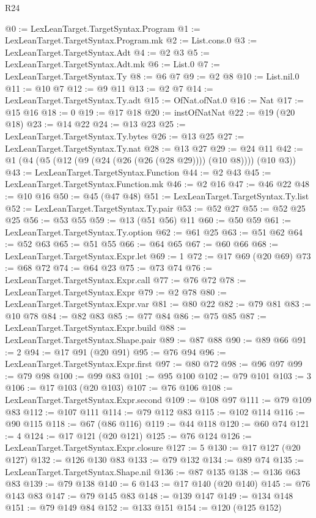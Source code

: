 \begin{lexlean}{R24}
\begin{coremodule}
@0 := LexLeanTarget.TargetSyntax.Program
@1 := LexLeanTarget.TargetSyntax.Program.mk
@2 := List.cons.{0}
@3 := LexLeanTarget.TargetSyntax.Adt
@4 := @2 @3
@5 := LexLeanTarget.TargetSyntax.Adt.mk
@6 := List.{0}
@7 := LexLeanTarget.TargetSyntax.Ty
@8 := @6 @7
@9 := @2 @8
@10 := List.nil.{0}
@11 := @10 @7
@12 := @9 @11
@13 := @2 @7
@14 := LexLeanTarget.TargetSyntax.Ty.adt
@15 := OfNat.ofNat.{0}
@16 := Nat
@17 := @15 @16
@18 := 0
@19 := @17 @18
@20 := instOfNatNat
@22 := @19 (@20 @18)
@23 := @14 @22
@24 := @13 @23
@25 := LexLeanTarget.TargetSyntax.Ty.bytes
@26 := @13 @25
@27 := LexLeanTarget.TargetSyntax.Ty.nat
@28 := @13 @27
@29 := @24 @11
@42 := @1 (@4 (@5 (@12 (@9 (@24 (@26 (@26 (@28 @29)))) (@10 @8)))) (@10 @3))
@43 := LexLeanTarget.TargetSyntax.Function
@44 := @2 @43
@45 := LexLeanTarget.TargetSyntax.Function.mk
@46 := @2 @16
@47 := @46 @22
@48 := @10 @16
@50 := @45 (@47 @48)
@51 := LexLeanTarget.TargetSyntax.Ty.list
@52 := LexLeanTarget.TargetSyntax.Ty.pair
@53 := @52 @27
@55 := @52 @25 @25
@56 := @53 @55
@59 := @13 (@51 @56) @11
@60 := @50 @59
@61 := LexLeanTarget.TargetSyntax.Ty.option
@62 := @61 @25
@63 := @51 @62
@64 := @52 @63
@65 := @51 @55
@66 := @64 @65
@67 := @60 @66
@68 := LexLeanTarget.TargetSyntax.Expr.let
@69 := 1
@72 := @17 @69 (@20 @69)
@73 := @68 @72
@74 := @64 @23
@75 := @73 @74
@76 := LexLeanTarget.TargetSyntax.Expr.call
@77 := @76 @72
@78 := LexLeanTarget.TargetSyntax.Expr
@79 := @2 @78
@80 := LexLeanTarget.TargetSyntax.Expr.var
@81 := @80 @22
@82 := @79 @81
@83 := @10 @78
@84 := @82 @83
@85 := @77 @84
@86 := @75 @85
@87 := LexLeanTarget.TargetSyntax.Expr.build
@88 := LexLeanTarget.TargetSyntax.Shape.pair
@89 := @87 @88
@90 := @89 @66
@91 := 2
@94 := @17 @91 (@20 @91)
@95 := @76 @94
@96 := LexLeanTarget.TargetSyntax.Expr.first
@97 := @80 @72
@98 := @96 @97
@99 := @79 @98
@100 := @99 @83
@101 := @95 @100
@102 := @79 @101
@103 := 3
@106 := @17 @103 (@20 @103)
@107 := @76 @106
@108 := LexLeanTarget.TargetSyntax.Expr.second
@109 := @108 @97
@111 := @79 @109 @83
@112 := @107 @111
@114 := @79 @112 @83
@115 := @102 @114
@116 := @90 @115
@118 := @67 (@86 @116)
@119 := @44 @118
@120 := @60 @74
@121 := 4
@124 := @17 @121 (@20 @121)
@125 := @76 @124
@126 := LexLeanTarget.TargetSyntax.Expr.closure
@127 := 5
@130 := @17 @127 (@20 @127)
@132 := @126 @130 @83
@133 := @79 @132
@134 := @89 @74
@135 := LexLeanTarget.TargetSyntax.Shape.nil
@136 := @87 @135
@138 := @136 @63 @83
@139 := @79 @138
@140 := 6
@143 := @17 @140 (@20 @140)
@145 := @76 @143 @83
@147 := @79 @145 @83
@148 := @139 @147
@149 := @134 @148
@151 := @79 @149 @84
@152 := @133 @151
@154 := @120 (@125 @152)

\end{coremodule}
\end{lexlean}
